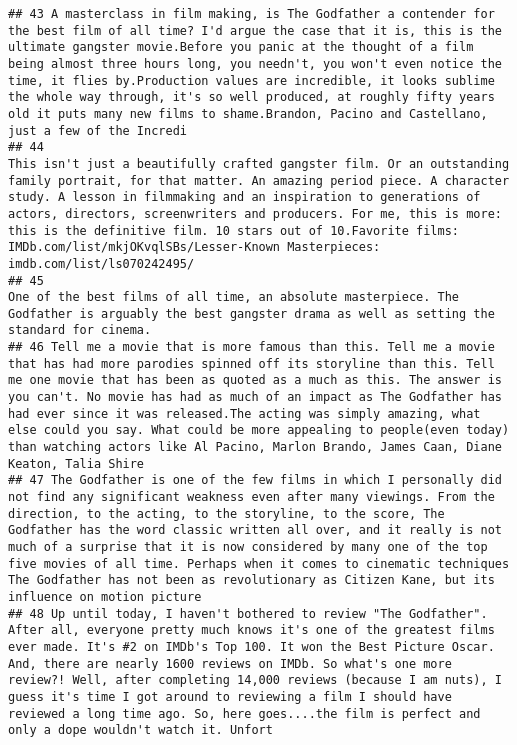 \documentclass[
]{article}
\begin{document}
\begin{verbatim}
## 43 A masterclass in film making, is The Godfather a contender for the best film of all time? I'd argue the case that it is, this is the ultimate gangster movie.Before you panic at the thought of a film being almost three hours long, you needn't, you won't even notice the time, it flies by.Production values are incredible, it looks sublime the whole way through, it's so well produced, at roughly fifty years old it puts many new films to shame.Brandon, Pacino and Castellano, just a few of the Incredi
## 44                                                                               This isn't just a beautifully crafted gangster film. Or an outstanding family portrait, for that matter. An amazing period piece. A character study. A lesson in filmmaking and an inspiration to generations of actors, directors, screenwriters and producers. For me, this is more: this is the definitive film. 10 stars out of 10.Favorite films: IMDb.com/list/mkjOKvqlSBs/Lesser-Known Masterpieces: imdb.com/list/ls070242495/
## 45                                                                                                                                                                                                                                                                                                                                                            One of the best films of all time, an absolute masterpiece. The Godfather is arguably the best gangster drama as well as setting the standard for cinema.
## 46 Tell me a movie that is more famous than this. Tell me a movie that has had more parodies spinned off its storyline than this. Tell me one movie that has been as quoted as a much as this. The answer is you can't. No movie has had as much of an impact as The Godfather has had ever since it was released.The acting was simply amazing, what else could you say. What could be more appealing to people(even today) than watching actors like Al Pacino, Marlon Brando, James Caan, Diane Keaton, Talia Shire 
## 47 The Godfather is one of the few films in which I personally did not find any significant weakness even after many viewings. From the direction, to the acting, to the storyline, to the score, The Godfather has the word classic written all over, and it really is not much of a surprise that it is now considered by many one of the top five movies of all time. Perhaps when it comes to cinematic techniques The Godfather has not been as revolutionary as Citizen Kane, but its influence on motion picture
## 48 Up until today, I haven't bothered to review "The Godfather". After all, everyone pretty much knows it's one of the greatest films ever made. It's #2 on IMDb's Top 100. It won the Best Picture Oscar. And, there are nearly 1600 reviews on IMDb. So what's one more review?! Well, after completing 14,000 reviews (because I am nuts), I guess it's time I got around to reviewing a film I should have reviewed a long time ago. So, here goes....the film is perfect and only a dope wouldn't watch it. Unfort

\end{verbatim}
\end{document}
